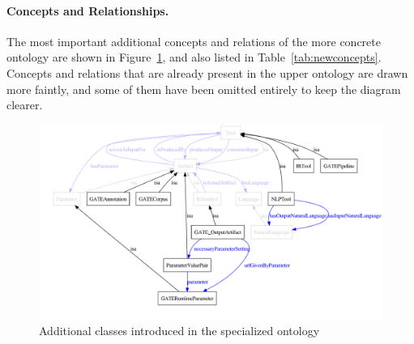 \paragraph{Concepts and Relationships.} The most important
additional concepts and relations of the more concrete ontology are
shown in Figure~\ref{fig:artifact2}, and also listed in
Table~\ref{tab:newconcepts}. Concepts and relations that are already
present in the upper ontology are drawn more faintly, and some of them
have been omitted entirely to keep the diagram clearer.

\begin{figure}[tb]
  \centering
  \includegraphics[width=1.0\textwidth]{pictures/artifact2.pdf}
  \caption{Additional classes introduced in the specialized ontology}
  \label{fig:artifact2}
\end{figure}

